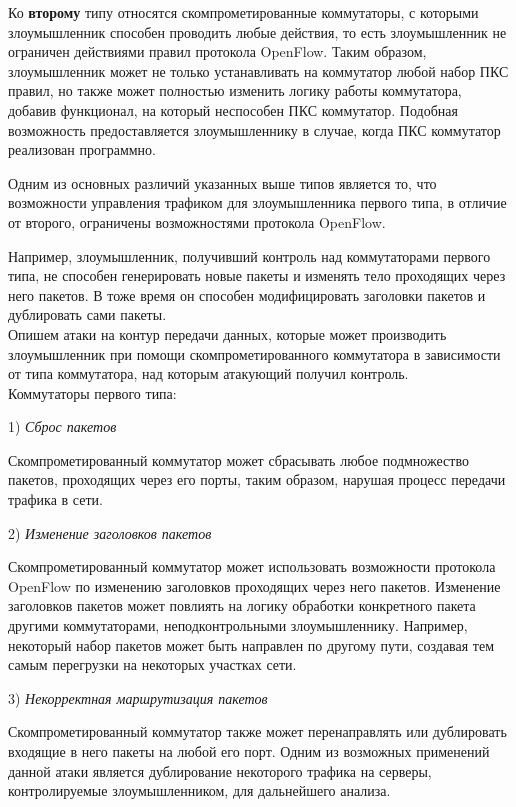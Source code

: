 \documentclass[../thesis.tex]{subfiles}
\begin{document}
Ко \textbf{второму} типу относятся скомпрометированные коммутаторы, с которыми злоумышленник способен проводить любые действия, то есть злоумышленник не ограничен действиями правил протокола OpenFlow.
Таким образом, злоумышленник может не только устанавливать на коммутатор любой набор ПКС правил, но также может полностью изменить логику работы коммутатора, добавив функционал, на который неспособен ПКС коммутатор.
Подобная возможность предоставляется злоумышленнику в случае, когда ПКС коммутатор реализован программно.

Одним из основных различий указанных выше типов является то, что возможности управления трафиком для злоумышленника первого типа, в отличие от второго, ограничены возможностями протокола OpenFlow.

Например, злоумышленник, получивший контроль над коммутаторами первого типа, не способен генерировать новые пакеты и изменять тело проходящих через него пакетов.
В тоже время он способен модифицировать заголовки пакетов и дублировать сами пакеты.
\\

Опишем атаки на контур передачи данных, которые может производить злоумышленник при помощи скомпрометированного коммутатора в зависимости от типа коммутатора, над которым атакующий получил контроль.
\\

Коммутаторы первого типа:

1)	\textit{Сброс пакетов}

Скомпрометированный коммутатор может сбрасывать любое подмножество пакетов, проходящих через его порты, таким образом, нарушая процесс передачи трафика в сети.

2)	\textit{Изменение заголовков пакетов}

Скомпрометированный коммутатор может использовать возможности протокола OpenFlow по изменению заголовков проходящих через него пакетов.
Изменение заголовков пакетов может повлиять на логику обработки конкретного пакета другими коммутаторами, неподконтрольными злоумышленнику.
Например, некоторый набор пакетов может быть направлен по другому пути, создавая тем самым перегрузки на некоторых участках сети.

3)	\textit{Некорректная маршрутизация пакетов}

Скомпрометированный коммутатор также может перенаправлять или дублировать входящие в него пакеты на любой его порт.
Одним из возможных применений данной атаки является дублирование некоторого трафика на серверы, контролируемые злоумышленником, для дальнейшего анализа.
\\
\end{document}
